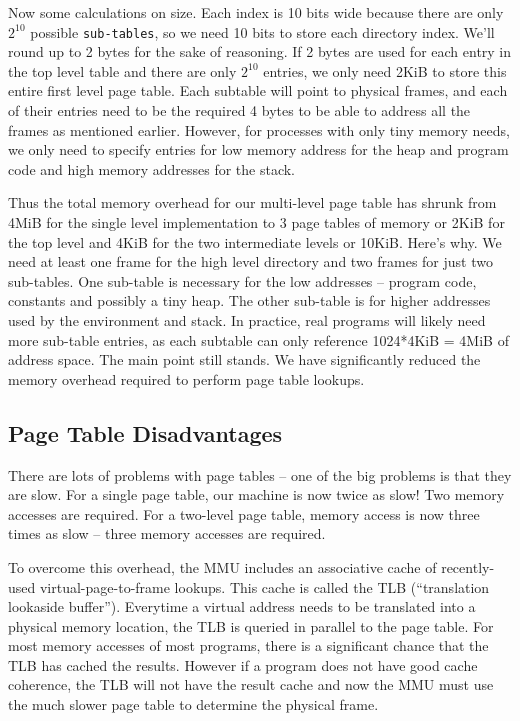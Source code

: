 Now some calculations on size.
Each  index is 10 bits wide because there are only $2^{10}$ possible \texttt{sub-tables}, so we need 10 bits to store each directory index.
We'll round up to 2 bytes for the sake of reasoning.
If 2 bytes are used for each entry in the top level table and there are only $2^{10}$ entries, we only need 2KiB to store this entire first level page table.
Each subtable will point to physical frames, and each of their entries need to be the required 4 bytes to be able to address all the frames as mentioned earlier.
However, for processes with only tiny memory needs, we only need to specify entries for low memory address for the heap and program code and high memory addresses for the stack.

Thus the total memory overhead for our multi-level page table has shrunk from 4MiB for the single level implementation to 3 page tables of memory or 2KiB for the top level and 4KiB for the two intermediate levels or 10KiB.
Here's why.
We need at least one frame for the high level directory and two frames for just two sub-tables.
One sub-table is necessary for the low addresses -- program code, constants and possibly a tiny heap.
The other sub-table is for higher addresses used by the environment and stack.
In practice, real programs will likely need more sub-table entries, as each subtable can only reference 1024*4KiB = 4MiB of address space.
The main point still stands.
We have significantly reduced the memory overhead required to perform page table lookups.

\subsection{Page Table Disadvantages}

There are lots of problems with page tables -- one of the big problems is that they are slow.
For a single page table, our machine is now twice as slow!
Two memory accesses are required.
For a two-level page table, memory access is now three times as slow -- three memory accesses are required.

To overcome this overhead, the MMU includes an associative cache of recently-used virtual-page-to-frame lookups.
This cache is called the TLB (``translation lookaside buffer'').
Everytime a virtual address needs to be translated into a physical memory location, the TLB is queried in parallel to the page table.
For most memory accesses of most programs, there is a significant chance that the TLB has cached the results.
However if a program does not have good cache coherence, the TLB will not have the result cache and now the MMU must use the much slower page table to determine the physical frame.

